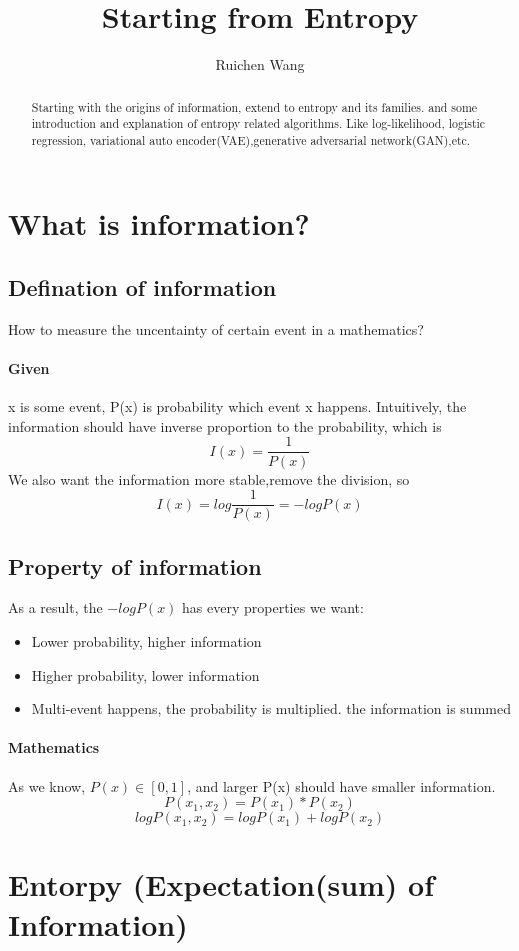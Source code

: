 \documentclass{article}
\author{Ruichen Wang}
\title{Starting from Entropy}
\begin{document}
\maketitle


\begin{abstract}
Starting with the origins of information, extend to entropy and its families. and some introduction and explanation of entropy related algorithms. Like log-likelihood, logistic regression, variational auto encoder(VAE),generative adversarial network(GAN),etc.
\end{abstract}

\tableofcontents
\section{What is information?} 
\subsection{Defination of information}
How to measure the uncentainty of certain event in a mathematics?
\paragraph{Given} x is some event, P(x) is probability which event x happens. Intuitively, the information should have inverse proportion to the probability, which is 
$$I(x)=\frac{1}{P(x)}$$
We also want the information more stable,remove the division, so
$$I(x)=log\frac{1}{P(x)}=-logP(x)$$
\subsection{Property of information}
As a result, the $-logP(x)$ has every properties we want:
\begin{itemize}
\item Lower probability, higher information
\item Higher probability, lower information
\item Multi-event happens, the probability is multiplied. the information is summed
\end{itemize}
\paragraph{Mathematics}
As we know, $P(x) \in [0,1]$, and larger P(x) should have smaller information.
$$P(x_{1},x_{2})=P(x_{1})*P(x_{2})$$
$$logP(x_{1},x_{2})=logP(x_{1})+logP(x_{2})$$
\section{Entorpy (Expectation(sum) of Information)}
\end{document}

